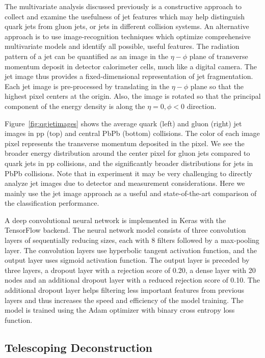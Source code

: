 \documentclass[notoc]{JHEP3}
\begin{document}
The multivariate analysis discussed previously is a constructive approach to collect and examine the usefulness of jet features which may help distinguish quark jets from gluon jets, or jets in different collision systems. An alternative approach is to use image-recognition techniques which optimize comprehensive multivariate models and identify all possible, useful features. The radiation pattern of a jet can be quantified as an image in the $\eta-\phi$ plane of transverse momentum deposit in detector calorimeter cells, much like a digital camera. The jet image thus provides a fixed-dimensional representation of jet fragmentation. Each jet image is pre-processed \cite{deOliveira:2015xxd} by translating in the $\eta-\phi$ plane so that the highest pixel centers at the origin. Also, the image is rotated so that the principal component of the energy density is along the $\eta=0, \phi<0$ direction.

Figure~\ref{fig:qgjetimages} shows the average quark (left) and gluon (right) jet images in pp (top) and central PbPb (bottom) collisions. The color of each image pixel represents the transverse momentum deposited in the pixel. We see the broader energy distribution around the center pixel for gluon jets compared to quark jets in pp collisions, and the significantly broader distributions for jets in PbPb collisions. Note that in experiment it may be very challenging to directly analyze jet images due to detector and measurement considerations. Here we mainly use the jet image approach as a useful and state-of-the-art comparison of the classification performance.
	
A deep convolutional neural network is implemented in Keras with the TensorFlow \cite{} backend. The neural network model consists of three convolution layers of sequentially reducing sizes, each with 8 filters followed by a max-pooling layer. The convolution layers use hyperbolic tangent activation function, and the output layer uses sigmoid activation function. The output layer is preceded by three layers, a dropout layer with a rejection score of 0.20, a dense layer with 20 nodes and an additional dropout layer with a reduced rejection score of 0.10. The additional dropout layer helps filtering less important features from previous layers and thus increases the speed and efficiency of the model training. The model is trained using the Adam optimizer with binary cross entropy loss function.
	
\subsection{Telescoping Deconstruction}
\label{sec:tjet}
\end{document}
